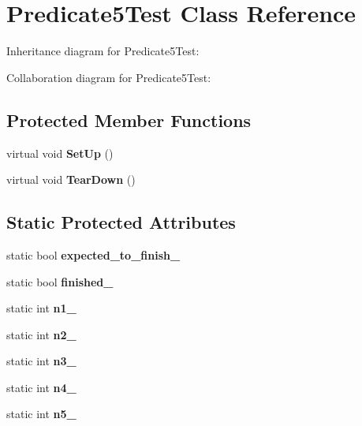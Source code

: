\hypertarget{classPredicate5Test}{}\section{Predicate5\+Test Class Reference}
\label{classPredicate5Test}


Inheritance diagram for Predicate5\+Test\+:


Collaboration diagram for Predicate5\+Test\+:
\subsection*{Protected Member Functions}
\begin{DoxyCompactItemize}
\item 
\mbox{\label{classPredicate5Test_a42bf622b4f2134d0497cd42fd2e3e1df}} 
virtual void {\bfseries Set\+Up} ()
\item 
\mbox{\label{classPredicate5Test_ab7bc4521d96174d5ef96156edc15444d}} 
virtual void {\bfseries Tear\+Down} ()
\end{DoxyCompactItemize}
\subsection*{Static Protected Attributes}
\begin{DoxyCompactItemize}
\item 
\mbox{\label{classPredicate5Test_aa502b7a330cc5c64785ff59aad3ef180}} 
static bool {\bfseries expected\+\_\+to\+\_\+finish\+\_\+}
\item 
\mbox{\label{classPredicate5Test_a5003aada64accf06cdb28b1ff1797353}} 
static bool {\bfseries finished\+\_\+}
\item 
\mbox{\label{classPredicate5Test_a356c8e361185b234a417ed895eb14e38}} 
static int {\bfseries n1\+\_\+}
\item 
\mbox{\label{classPredicate5Test_a5bf48ba65b7baf20abe1d2af90779ce0}} 
static int {\bfseries n2\+\_\+}
\item 
\mbox{\label{classPredicate5Test_a63723efb915dbf418c31b97b64dabc0e}} 
static int {\bfseries n3\+\_\+}
\item 
\mbox{\label{classPredicate5Test_a5d66aa58badddc8d3d8070a93c0558d6}} 
static int {\bfseries n4\+\_\+}
\item 
\mbox{\label{classPredicate5Test_a96badba6366235a2771b27ea014bd9ce}} 
static int {\bfseries n5\+\_\+}
\end{DoxyCompactItemize}
